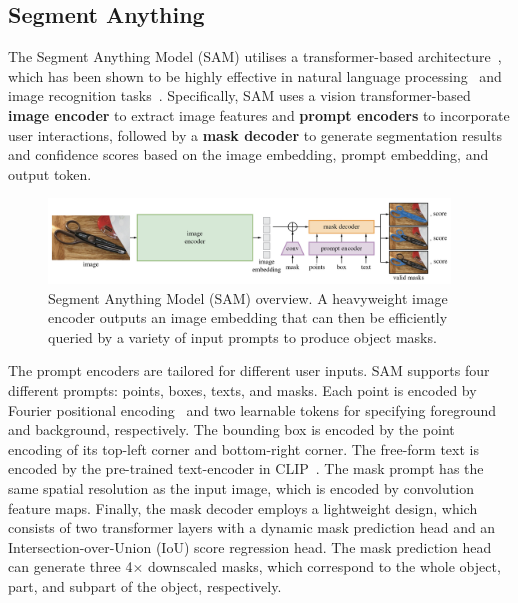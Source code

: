 \documentclass[runningheads]{llncs}
\begin{document}
\subsection{Segment Anything}

The Segment Anything Model (SAM) utilises a transformer-based architecture~\cite{attention-Nips17}, which has been shown to be highly effective in natural language processing~\cite{GPT-3} and image recognition tasks~\cite{ViT2020}. Specifically, SAM uses a vision transformer-based \textbf{image encoder} to extract image features and \textbf{prompt encoders} to incorporate user interactions, followed by a \textbf{mask decoder} to generate segmentation results and confidence scores based on the image embedding, prompt embedding, and output token. 

\begin{figure}[h!]
\centering
\includegraphics[scale=0.5,width=0.95\textwidth]{imgs/SAM_model_diagram.png}
\caption{Segment Anything Model (SAM) overview. A heavyweight image encoder outputs an image embedding that can
then be efficiently queried by a variety of input prompts to produce object masks.}
\label{fig:sam-diagram}
\end{figure}

The prompt encoders are tailored for different user inputs. SAM supports four different prompts: points, boxes, texts, and masks. Each point is encoded by Fourier positional encoding~\cite{FourierPE-Nips20} and two learnable tokens for specifying foreground and background, respectively. The bounding box is encoded by the point encoding of its top-left corner and bottom-right corner. The free-form text is encoded by the pre-trained text-encoder in CLIP~\cite{CLIP-ICML2021}. The mask prompt has the same spatial resolution as the input image, which is encoded by convolution feature maps. 
Finally, the mask decoder employs a lightweight design, which consists of two transformer layers with a dynamic mask prediction head and an Intersection-over-Union (IoU) score regression head. The mask prediction head can generate three 4$\times$ downscaled masks, which correspond to the whole object, part, and subpart of the object, respectively.
\end{document}
